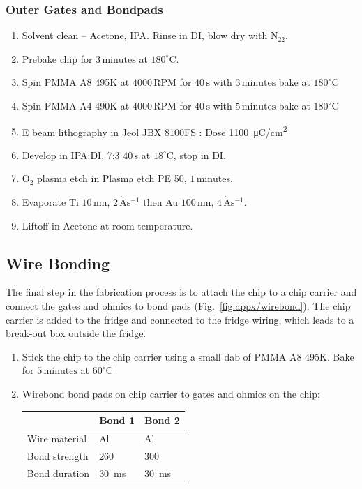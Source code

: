 \subsubsection{Outer Gates and Bondpads}

\begin{enumerate}
\item Solvent clean – Acetone, IPA. Rinse in DI, blow dry with $\mathrm{N_22}$.
\item Prebake chip for $3\,\mathrm{minutes}$ at $180^\circ$C.
\item Spin PMMA A8 495K at $4000\,\mathrm{RPM}$ for $40\,\mathrm{s}$ with $3\,\mathrm{minutes}$ bake at $180^\circ$C
\item Spin PMMA A4 490K at $4000\,\mathrm{RPM}$ for $40\,\mathrm{s}$ with $5\,\mathrm{minutes}$ bake at $180^\circ$C
\item E beam lithography in Jeol JBX 8100FS : Dose \qty{1100}{\micro C/cm^2}
\item Develop in IPA:DI, 7:3 $40\,\mathrm{s}$ at $18^\circ$C, stop in DI.
\item $\mathrm{O_2}$ plasma etch in Plasma etch PE 50, $1\,\mathrm{minutes}$.
\item Evaporate Ti $10\,\mathrm{nm}$, $2\,\mathrm{\dot{A}s^{-1}}$ then Au $100\,\mathrm{nm}$, $4\,\mathrm{\dot{A}s^{-1}}$.
\item Liftoff in Acetone at room temperature.
\end{enumerate}




\subsection{Wire Bonding}

The final step in the fabrication process is to attach the chip to a chip carrier and connect the gates and ohmics to bond pads (Fig.~\ref{fig:appx/wirebond}). The chip carrier is added to the fridge and connected to the fridge wiring, which leads to a break-out box outside the fridge. 


\begin{enumerate}
\item Stick the chip to the chip carrier using a small dab of PMMA A8 495K. Bake for $5\,\mathrm{minutes}$ at $60^\circ$C
\item Wirebond bond pads on chip carrier to gates and ohmics on the chip:
\begin{table}[H] 
\centering
 \begin{tabular}{|p{3.0cm}|p{2.0cm}|p{2.0cm}|}
 \hline
 & Bond 1 & Bond 2\\
 \hline
 Wire material & Al & Al\\
 Bond strength & 260 & 300\\
 Bond duration & \qty{30}{ms} & \qty{30}{ms} \\
 \hline
 \end{tabular}
\label{tab:wire_bonding}
\end{table}
\end{enumerate}


